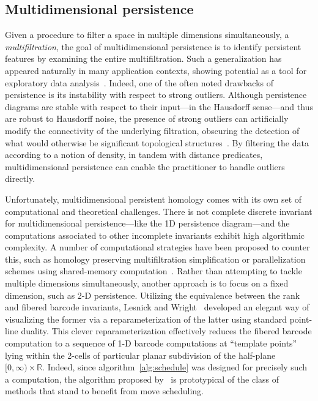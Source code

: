 \documentclass{article} %
\begin{document}
\subsection*{Multidimensional persistence}
Given a procedure to filter a space in multiple dimensions simultaneously, a \emph{multifiltration}, the goal of multidimensional persistence is to identify persistent features by examining the entire multifiltration. 
Such a generalization has appeared naturally in many application contexts, showing potential as a tool for exploratory data analysis~\cite{lesnick2012multidimensional}. 
Indeed, one of the often noted drawbacks of persistence is its instability with respect to strong outliers. 
Although persistence diagrams are stable with respect to their input---in the Hausdorff sense---and thus are robust to Hausdorff noise, the presence of strong outliers can artificially modify the connectivity of the underlying filtration, obscuring the detection of what would otherwise be significant topological structures~\cite{buchet2015topological}. 
By filtering the data according to a notion of density, in tandem with distance predicates, multidimensional persistence can enable the practitioner to handle outliers directly.

Unfortunately, multidimensional persistent homology comes with its own set of computational and theoretical challenges. 
There is not complete discrete invariant for multidimensional persistence---like the 1D persistence diagram---and the computations associated to other incomplete invariants exhibit high algorithmic complexity. A number of computational strategies have been proposed to counter this, such as homology preserving multifiltration simplification or parallelization schemes using shared-memory computation~\cite{fugacci2019chunk}. Rather than attempting to tackle multiple dimensions simultaneously, another approach is to focus on a fixed dimension, such as 2-D persistence. Utilizing the equivalence between the rank and fibered barcode invariants, Lesnick and Wright~\cite{lesnick2015interactive} developed an elegant way of visualizing the former via a reparameterization of the latter using standard point-line duality. This clever reparameterization effectively reduces the fibered barcode computation to a sequence of 1-D barcode computations at ``template points'' lying within the 2-cells of particular planar subdivision of the half-plane $[0, \infty) \times \mathbb{R}$. Indeed, since algorithm~\ref{alg:schedule} was designed for precisely such a computation, the algorithm proposed by~\cite{lesnick2015interactive} is prototypical of the class of methods that stand to benefit from move scheduling. 
\end{document}
